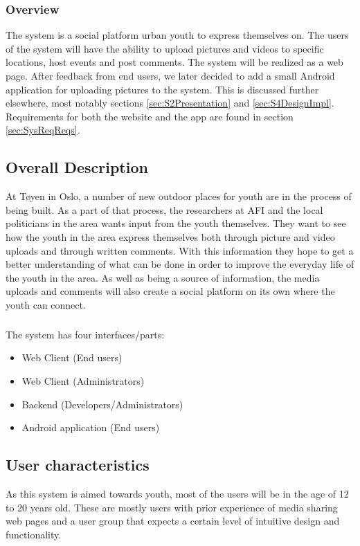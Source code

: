 \subsubsection*{Overview}
The system is a social platform urban youth to express themselves on. The users of the system will have the ability to upload pictures and videos to specific locations, host events and post comments. The system will be realized as a web page. After feedback from end users, we later decided to add a small Android application for uploading pictures to the system. This is discussed further elsewhere, most notably sections \ref{sec:S2Presentation} and \ref{sec:S4DesignImpl}. Requirements for both the website and the app are found in section \ref{sec:SysReqReqs}.

\subsection{Overall Description}
\label{subsec:SysReqIntroDescr}

At T\o yen in Oslo, a number of new outdoor places for youth are in the process of being built. As a part of that process, the researchers at AFI and the local politicians in the area wants input from the youth themselves. They want to see how the youth in the area express themselves both through picture and video uploads and through written comments. With this information they hope to get a better understanding of what can be done in order to improve the everyday life of the youth in the area. As well as being a source of information, the media uploads and comments will also create a social platform on its own where the youth can connect.
\subparagraph{} The system has four interfaces/parts:
\begin{itemize}
    \item Web Client (End users)
    \item Web Client (Administrators)
    \item Backend (Developers/Administrators)
    \item Android application (End users)
\end{itemize}

\subsection{User characteristics}
\label{subsec:SysReqIntroUserChar}

As this system is aimed towards youth, most of the users will be in the age of 12 to 20 years old. These are mostly users with prior experience of media sharing web pages and a user group that expects a certain level of intuitive design and functionality.

